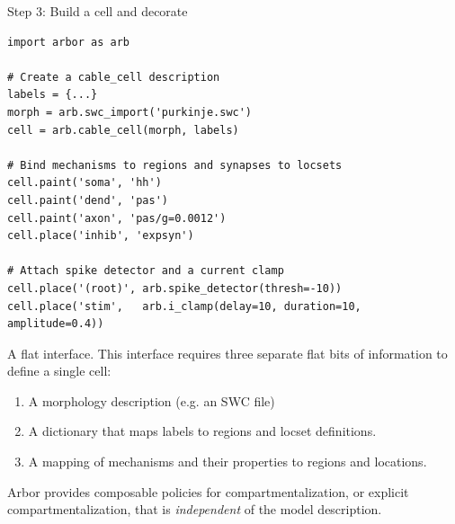 \documentclass[aspectratio=43]{beamer}
\newcommand{\arbor}{{\ttfamily Arbor}\xspace}
\begin{document}
\begin{frame}[fragile]{Step 3: Build a cell and decorate}

    \begin{lstlisting}[style=talkpython]
import arbor as arb

# Create a cable_cell description
labels = {...}
morph = arb.swc_import('purkinje.swc')
cell = arb.cable_cell(morph, labels)

# Bind mechanisms to regions and synapses to locsets
cell.paint('soma', 'hh')
cell.paint('dend', 'pas')
cell.paint('axon', 'pas/g=0.0012')
cell.place('inhib', 'expsyn')

# Attach spike detector and a current clamp
cell.place('(root)', arb.spike_detector(thresh=-10))
cell.place('stim',   arb.i_clamp(delay=10, duration=10, amplitude=0.4))
    \end{lstlisting}
\end{frame}

\begin{frame}[fragile]{A flat interface.}
    This interface requires three separate flat bits of information to define a single cell:

    \vspace{10pt}

    \begin{enumerate}
        \item A morphology description (e.g. an SWC file)
        \item A dictionary that maps labels to regions and locset definitions.
        \item A mapping of mechanisms and their properties to regions and locations.
    \end{enumerate}

    \vspace{10pt}

    \arbor provides composable policies for compartmentalization, or explicit compartmentalization, that is \textit{independent} of the model description.
\end{frame}

\end{document}
